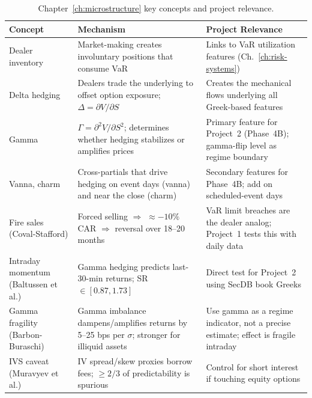 \begin{table}[h]
\centering
\small
\begin{tabular}{@{}p{3cm}p{4.5cm}p{6cm}@{}}
\toprule
\textbf{Concept} & \textbf{Mechanism} & \textbf{Project Relevance} \\
\midrule
Dealer inventory &
  Market-making creates involuntary positions that consume VaR &
  Links to VaR utilization features
  (Ch.~\ref{ch:risk-systems}) \\[6pt]

Delta hedging &
  Dealers trade the underlying to offset option exposure;
  $\Delta = \partial V / \partial S$ &
  Creates the mechanical flows underlying all Greek-based
  features \\[6pt]

Gamma &
  $\Gamma = \partial^2 V / \partial S^2$; determines whether
  hedging stabilizes or amplifies prices &
  Primary feature for Project~2 (Phase~4B); gamma-flip level
  as regime boundary \\[6pt]

Vanna, charm &
  Cross-partials that drive hedging on event days (vanna) and
  near the close (charm) &
  Secondary features for Phase~4B; add on scheduled-event
  days \\[6pt]

Fire sales (Coval-Stafford) &
  Forced selling $\Rightarrow$ $\approx -10\%$ CAR
  $\Rightarrow$ reversal over 18--20 months &
  VaR limit breaches are the dealer analog;
  Project~1 tests this with daily data \\[6pt]

Intraday momentum (Baltussen et al.) &
  Gamma hedging predicts last-30-min returns;
  SR $\in [0.87, 1.73]$ &
  Direct test for Project~2 using SecDB book Greeks \\[6pt]

Gamma fragility (Barbon-Buraschi) &
  Gamma imbalance dampens/amplifies returns by 5--25 bps
  per $\sigma$; stronger for illiquid assets &
  Use gamma as a regime indicator, not a precise estimate;
  effect is fragile intraday \\[6pt]

IVS caveat (Muravyev et al.) &
  IV spread/skew proxies borrow fees; $\ge 2/3$ of
  predictability is spurious &
  Control for short interest if touching equity options \\
\bottomrule
\end{tabular}
\caption{Chapter~\ref{ch:microstructure} key concepts and project
relevance.}
\label{tab:ch4-summary}
\end{table}

